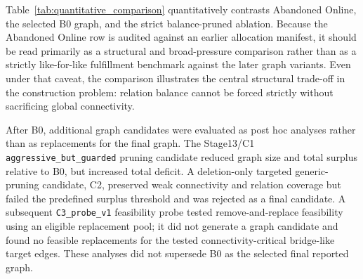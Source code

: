 \documentclass[12pt,a4paper]{article}
\begin{document}
Table~\ref{tab:quantitative_comparison} quantitatively contrasts Abandoned Online, the selected B0 graph, and the strict balance-pruned ablation. Because the Abandoned Online row is audited against an earlier allocation manifest, it should be read primarily as a structural and broad-pressure comparison rather than as a strictly like-for-like fulfillment benchmark against the later graph variants. Even under that caveat, the comparison illustrates the central structural trade-off in the construction problem: relation balance cannot be forced strictly without sacrificing global connectivity.

After B0, additional graph candidates were evaluated as post hoc analyses rather than as replacements for the final graph. The Stage13/C1 \texttt{aggressive\_but\_guarded} pruning candidate reduced graph size and total surplus relative to B0, but increased total deficit. A deletion-only targeted generic-pruning candidate, C2, preserved weak connectivity and relation coverage but failed the predefined surplus threshold and was rejected as a final candidate. A subsequent \texttt{C3\_probe\_v1} feasibility probe tested remove-and-replace feasibility using an eligible replacement pool; it did not generate a graph candidate and found no feasible replacements for the tested connectivity-critical bridge-like target edges. These analyses did not supersede B0 as the selected final reported graph.
\end{document}
